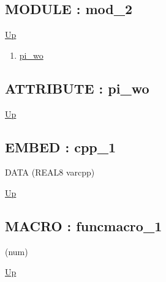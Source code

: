 \subsection*{MODULE : mod\_2}
\hypertarget{ecldoc:example.mod_2}{}
\par
\begin{minipage}[t]{\textwidth}
\begin{flushleft}
  
\end{flushleft}
\end{minipage}
\hyperlink{ecldoc:example}{Up} \\
\par
\par
\begin{enumerate}
\item \hyperlink{ecldoc:example.mod_2.pi_wo}{pi\_wo}
\end{enumerate}
\subsection*{ATTRIBUTE : pi\_wo}
\hypertarget{ecldoc:example.mod_2.pi_wo}{}
\par
\begin{minipage}[t]{\textwidth}
\begin{flushleft}
  
\end{flushleft}
\end{minipage}
\hyperlink{ecldoc:example.mod_2}{Up} \\
\par
\par

\subsection*{EMBED : cpp\_1}
\hypertarget{ecldoc:example.cpp_1}{}
\par
\begin{minipage}[t]{\textwidth}
\begin{flushleft}
DATA  (REAL8 varcpp)
\end{flushleft}
\end{minipage}
\hyperlink{ecldoc:example}{Up} \\
\par
\par
\subsection*{MACRO : funcmacro\_1}
\hypertarget{ecldoc:example.funcmacro_1}{}
\par
\begin{minipage}[t]{\textwidth}
\begin{flushleft}
  (num)
\end{flushleft}
\end{minipage}
\hyperlink{ecldoc:example}{Up} \\
\par
\par
